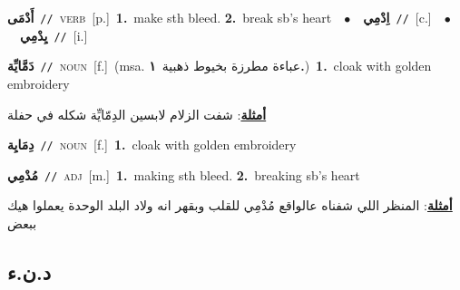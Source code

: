 \documentclass[10pt,a4paper,twoside]{article} %
\begin{document}
\begin{multicols}{2}
{\setlength\topsep{0pt}\textbf{\foreignlanguage{arabic}{أَدْمَى}}\ {\color{gray}\texttt{//}\color{black}}\ \textsc{verb}\ [p.]\ \textbf{1.}~make sth bleed.  \textbf{2.}~break sb's heart\ \ $\bullet$\ \ \setlength\topsep{0pt}\textbf{\foreignlanguage{arabic}{اِدْمِي}}\ {\color{gray}\texttt{//}\color{black}}\ [c.]\ \ $\bullet$\ \ \setlength\topsep{0pt}\textbf{\foreignlanguage{arabic}{يِدْمِي}}\ {\color{gray}\texttt{//}\color{black}}\ [i.]\ } \vspace{2mm}

{\setlength\topsep{0pt}\textbf{\foreignlanguage{arabic}{دَمَّايِّة}}\ {\color{gray}\texttt{//}\color{black}}\ \textsc{noun}\ [f.]\ \color{gray}(msa. \foreignlanguage{arabic}{عباءة مطرزة بخيوط ذهبية}~\foreignlanguage{arabic}{\textbf{١.}})\color{black}\ \textbf{1.}~cloak with golden embroidery\  \begin{flushright}\color{gray}\foreignlanguage{arabic}{\textbf{\underline{\foreignlanguage{arabic}{أمثلة}}}: شفت الزلام لابسين الدِمّايِّة شكله في حفلة}\end{flushright}\color{black}} \vspace{2mm}

{\setlength\topsep{0pt}\textbf{\foreignlanguage{arabic}{دِمَايِة}}\ {\color{gray}\texttt{//}\color{black}}\ \textsc{noun}\ [f.]\ \textbf{1.}~cloak with golden embroidery\ } \vspace{2mm}

{\setlength\topsep{0pt}\textbf{\foreignlanguage{arabic}{مُدْمِي}}\ {\color{gray}\texttt{//}\color{black}}\ \textsc{adj}\ [m.]\ \textbf{1.}~making sth bleed.  \textbf{2.}~breaking sb's heart\  \begin{flushright}\color{gray}\foreignlanguage{arabic}{\textbf{\underline{\foreignlanguage{arabic}{أمثلة}}}: المنظر اللي شفناه عالواقع مُدْمِي للقلب وبقهر انه ولاد البلد الوحدة يعملوا هيك ببعض}\end{flushright}\color{black}} \vspace{2mm}

\vspace{-3mm}
\subsection*{\color{blue}\foreignlanguage{arabic}{د.ن.ء}\color{blue}{}} 


\end{multicols}
\end{document}

